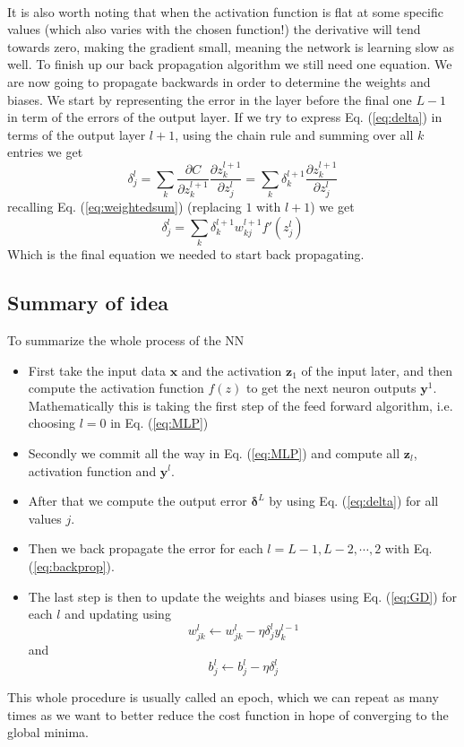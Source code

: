 \documentclass[14pt, a4paper]{book}
\begin{document}
\\It is also worth noting that when the activation function is flat at some specific values (which also varies with the chosen function!) the derivative will tend towards zero, making the gradient small, 
meaning the network is learning slow as well. To finish up our back propagation algorithm we still need one equation. We are now going to propagate backwards in order to determine the weights and biases. 
We start by representing the error in the layer before the final one $L-1$ in term of the errors of the output layer. If we try to express Eq. (\ref{eq:delta}) in terms of the output layer $l+1$, 
using the chain rule and summing over all $k$ entries we get
$$
\delta_j^l=\sum_k\frac{\partial C}{\partial z_k^{l+1}}\frac{\partial z_k^{l+1}}{\partial z_j^l} =\sum_k \delta_k^{l+1}\frac{\partial z_k^{l+1}}{\partial z_j^l}
$$
recalling Eq. (\ref{eq:weightedsum}) (replacing $1$ with $l+1$) we get
\begin{equation}\label{eq:backprop}
    \delta_j^l=\sum_k\delta_k^{l+1}w_{kj}^{l+1}f'(z_j^l)
\end{equation}
Which is the final equation we needed to start back propagating. 

\subsection{Summary of idea}
To summarize the whole process of the NN
\begin{itemize}
    \item First take the input data $\mathbf{x}$ and the activation $\mathbf{z}_1$ of the input later, and then compute the activation function $f(z)$ to get the next neuron outputs $\mathbf{y}^1$. 
    Mathematically this is taking the first step of the feed forward algorithm, i.e. choosing $l=0$ in Eq. (\ref{eq:MLP})
    \item Secondly we commit all the way in Eq. (\ref{eq:MLP}) and compute all $\mathbf{z}_l$, activation function and $\mathbf{y}^l$.
    \item After that we compute the output error $\bm{\delta}^L$ by using Eq. (\ref{eq:delta}) for all values $j$.
    \item Then we back propagate the error for each $l=L-1,L-2,\cdots,2$ with Eq. (\ref{eq:backprop}).
    \item The last step is then to update the weights and biases using Eq. (\ref{eq:GD}) for each $l$ and updating using
    $$
    w_{jk}^l\leftarrow w_{jk}^l-\eta\delta_j^ly_k^{l-1}
    $$
    and
    $$
    b_j^l \leftarrow b_j^l-\eta\delta_j^l
    $$
\end{itemize}
This whole procedure is usually called an epoch, which we can repeat as many times as we want to better reduce the cost function in hope of converging to the global minima.
\end{document}
